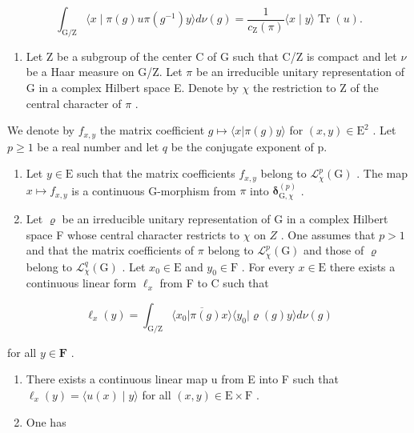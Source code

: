 \[
\int_ {\mathrm{G} / \mathrm{Z}} \langle x \mid \pi (g) u \pi (g ^ {- 1}) y \rangle d \nu (g) = \frac {1}{c _ {\mathrm{Z}} (\pi)} \langle x \mid y \rangle \operatorname{Tr} (u).
\]

\begin{enumerate}
\def\labelenumi{\arabic{enumi})}
\setcounter{enumi}{14}
\tightlist
\item
  Let Z be a subgroup of the center C of G such that C/Z is compact and let \(\nu\) be a Haar measure on G/Z. Let \(\pi\) be an irreducible unitary representation of G in a complex Hilbert space E. Denote by \(\chi\) the restriction to Z of the central character of \(\pi\) .
\end{enumerate}

We denote by \(f_{x,y}\) the matrix coefficient \(g \mapsto \langle x | \pi(g)y \rangle\) for \((x, y) \in \mathrm{E}^{2}\) . Let \(p \geqslant 1\) be a real number and let \(q\) be the conjugate exponent of p.

\begin{enumerate}
\def\labelenumi{\alph{enumi})}
\item
  Let \(y \in \mathrm{E}\) such that the matrix coefficients \(f_{x,y}\) belong to \(\mathcal{L}_{\chi}^{p}(\mathrm{G})\) . The map \(x \mapsto f_{x,y}\) is a continuous G-morphism from \(\pi\) into \(\boldsymbol{\delta}_{\mathrm{G},\chi}^{(p)}\) .
\item
  Let \(\varrho\) be an irreducible unitary representation of G in a complex Hilbert space F whose central character restricts to \(\chi\) on \(Z\) . One assumes that \(p > 1\) and that the matrix coefficients of \(\pi\) belong to \(\mathcal{L}_{\chi}^{p}(\mathrm{G})\) and those of \(\varrho\) belong to \(\mathcal{L}_{\chi}^{q}(\mathrm{G})\) . Let \(x_0 \in \mathrm{E}\) and \(y_0 \in \mathrm{F}\) . For every \(x \in \mathrm{E}\) there exists a continuous linear form \(\ell_x\) from F to C such that
\end{enumerate}

\[
\ell_ {x} (y) = \int_ {\mathrm{G/Z}} \overline {{\langle x _ {0} | \pi (g) x \rangle}} \langle y _ {0} | \varrho (g) y \rangle d \nu (g)
\]

for all \(y \in \mathbf{F}\) .

\begin{enumerate}
\def\labelenumi{\alph{enumi})}
\setcounter{enumi}{2}
\item
  There exists a continuous linear map u from E into F such that \(\ell_{x}(y)=\langle u(x)\mid y\rangle\) for all \((x,y)\in\mathrm{E}\times\mathrm{F}\) .
\item
  One has
\end{enumerate}

